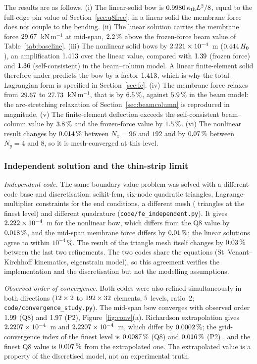 The results are as follows. (i) The linear-solid bow is $0.9980\,\kappa_{\mathrm{th}} L^2/8$, equal to the full-edge pin value of
Section~\ref{sec:q8free}: in a linear solid the membrane force does not couple to the bending. (ii) The
linear solution carries the membrane force $29.67$~kN\,m$^{-1}$ at mid-span, $2.2\,\%$ above the
frozen-force beam value of Table~\ref{tab:baseline}. (iii) The nonlinear solid bows by
$2.221\times10^{-4}$~m ($0.444\,H_0$), an amplification $1.413$ over the linear value, compared with $1.39$
(frozen force) and $1.36$ (self-consistent) in the beam--column model. A linear finite-element solid
therefore under-predicts the bow by a factor $1.413$, which is why the total-Lagrangian form is specified in
Section~\ref{sec:fe}. (iv) The membrane force relaxes from $29.67$ to $27.73$~kN\,m$^{-1}$, that is by
$6.5\,\%$, against $5.9\,\%$ in the beam model: the arc-stretching relaxation of
Section~\ref{sec:beamcolumn} is reproduced in magnitude. (v) The finite-element deflection exceeds the
self-consistent beam--column value by $3.8\,\%$ and the frozen-force value by $1.5\,\%$.
(vi) The nonlinear result changes by $0.014\,\%$ between $N_x=96$ and $192$ and by $0.07\,\%$ between
$N_y=4$ and $8$, so it is mesh-converged at this level.

\subsubsection{Independent solution and the thin-strip limit}
\label{sec:slender}
\emph{Independent code.} The same boundary-value problem was solved with a different code base and discretisation:
scikit-fem, six-node quadratic triangles, Lagrange-multiplier constraints for the end conditions, a different mesh
(\IndElements{} triangles at the finest level) and different quadrature (\texttt{code/fe\_independent.py}). It gives
$2.222\times10^{-4}$~m for the nonlinear bow, which differs from the Q8 value by $0.018\,\%$, and the mid-span membrane force
differs by $0.01\,\%$; the linear solutions agree to within $10^{-4}\,\%$. The result of the triangle mesh
itself changes by $0.03\,\%$ between the last two refinements. The two codes share the equations
(St~Venant--Kirchhoff kinematics, eigenstrain model), so this agreement verifies the implementation and the
discretisation but not the modelling assumptions.

\emph{Observed order of convergence.} Both codes were also refined simultaneously in both directions
($12\times2$ to $192\times32$ elements, $5$ levels, ratio~2; \texttt{code/convergence\_study.py}). The mid-span bow
converges with observed order $1.99$ (Q8) and $1.97$ (P2), Figure~\ref{fig:conv}(a). Richardson extrapolation
gives $2.2207\times10^{-4}$~m and $2.2207\times10^{-4}$~m, which differ by $0.0002\,\%$; the grid-convergence index of the finest
level is $0.0087\,\%$ (Q8) and $0.016\,\%$ (P2) \citep{celik2008procedure}, and the finest Q8 value is $0.007\,\%$ from the extrapolated
one. The extrapolated value is a property of the discretised model, not an experimental truth.

